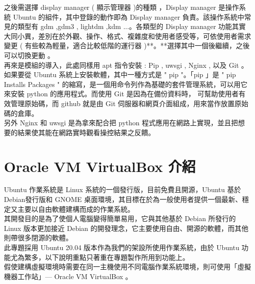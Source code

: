 \documentclass[14pt,a4paper]{report}  %
\begin{document}
 之後需選擇 display manager ( 顯示管理器 )的種類 ，Display manager 是操作系統 Ubuntu 的組件，其中登錄的動作即為 Display manager 負責。該操作系統中常見的類型有 gdm ,gdm3 , lightdm ,kdm ...。各類型的 Display manager 功能其實大同小異，差別在於外觀、操作、格式、複雜度和使用者感受等，可依使用者需求變更 ( 有些較為輕量，適合比較低階的運行器 )**。**選擇其中一個後繼續，之後可以切換更動 。\\

 再來是模組的導入，此處同樣用 apt 指令安裝 : Pip , uwsgi , Nginx  , 以及 Git 。如果要從 Ubuntu 系統上安裝軟體，其中一種方式是 " pip "。「pip 」是 " pip Installs Packages " 的縮寫，是一個用命令列作為基礎的套件管理系統，可以用它來安裝 python 的應用程式。而使用 Git 是因為在備份資料時， 可幫助使用者有效管理原始碼，而 github 就是由 Git 伺服器和網頁介面組成，用來當作放置原始碼的倉庫。\\
 另外 Nginx 和 uwsgi 是為拿來配合把 python 程式應用在網路上實現，並且把想要的結果使其能在網路實時觀看操控結果之反饋。\\
\section{Oracle VM VirtualBox 介紹}
 Ubuntu 作業系統是 Linux 系統的一個發行版，目前免費且開源，Ubuntu 基於 Debian發行版和 GNOME 桌面環境，其目標在於為一般使用者提供一個最新、穩定又主要以自由軟體建構而成的作業系統。\\
 
 其開發目的是為了使個人電腦變得簡單易用，它與其他基於 Debian 所發行的 Linux 版本更加接近 Debian 的開發理念，它主要使用自由、開源的軟體，而其他則帶很多閉源的軟體。\\
 
 此專題採用 Ubuntu 20.04 版本作為我們的架設所使用作業系統，由於 Ubuntu 功能尤為繁多，以下說明重點只著重在專題製作所用到功能上。\\
假使建構虛擬環境時需要在同一主機使用不同電腦作業系統環境，則可使用「虛擬機器工作站」— Oracle VM VirtualBox 。\\
\end{document}
